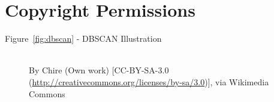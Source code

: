 \section{Copyright Permissions}
\label{sec:cperm}

\begin{description}
	\item [Figure~\ref{fig:dbscan} - DBSCAN Illustration]\hfill \\
	By Chire (Own work) [CC-BY-SA-3.0 (\url{http://creativecommons.org/licenses/by-sa/3.0})], via Wikimedia Commons
\end{description}

